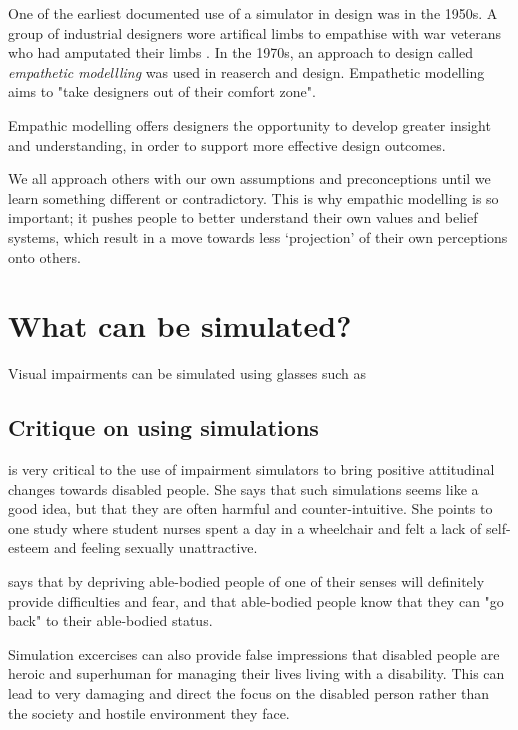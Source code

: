 
One of the earliest documented use of a simulator in design was in the 1950s. A group of industrial designers wore artifical limbs to empathise with war veterans who had amputated their limbs \parencite[3]{Cardoso2012}. In the 1970s, an approach to design called \textit{empathetic modellling} was used in reaserch and design. Empathetic modelling aims to "take designers out of their comfort zone". 
\begin{displayquote}
    Empathic modelling offers designers the opportunity to develop greater insight and understanding, in order to support more effective design outcomes.
    
    We all approach others with our own assumptions and preconceptions until we learn something different or contradictory. This is why empathic modelling is so important; it pushes people to better understand their own values and belief systems, which result in a move towards less ‘projection’ of their own perceptions onto others.
\end{displayquote}
\section{What can be simulated?}
Visual impairments can be simulated using glasses such as 

\subsection{Critique on using simulations}
\textcite{French1992} is very critical to the use of impairment simulators to bring positive attitudinal changes towards disabled people. She says that such simulations seems like a good idea, but that they are often harmful and counter-intuitive. She points to one study where student nurses spent a day in a wheelchair and felt a lack of self-esteem and feeling sexually unattractive. 

\textcite{French1992} says that by depriving able-bodied people of one of their senses will definitely provide difficulties and fear, and that able-bodied people know that they can "go back" to their able-bodied status. 

Simulation excercises can also provide false impressions that disabled people are heroic and superhuman for managing their lives living with a disability. This can lead to very damaging and direct the focus on the disabled person rather than the society and hostile environment they face. 

